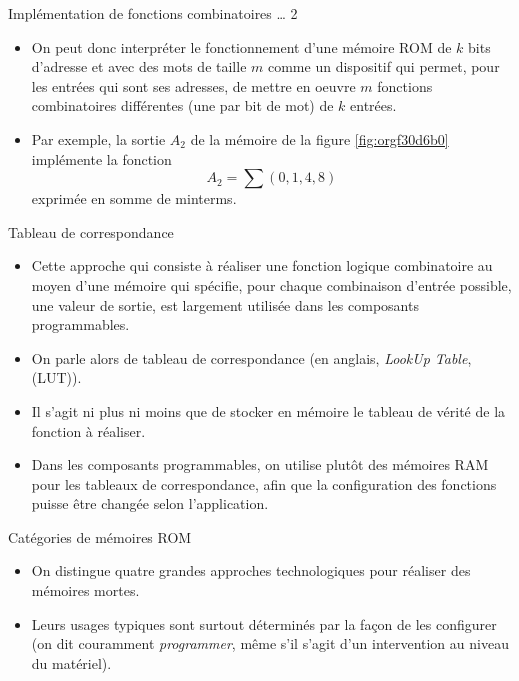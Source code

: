 \documentclass[presentation]{beamer}
\begin{document}
\begin{frame}[label={sec:org19e57ee}]{Implémentation de fonctions combinatoires \ldots{} 2}
\begin{itemize}
\item On peut donc interpréter le fonctionnement d'une mémoire ROM de \(k\) bits d'adresse et avec des mots de taille \(m\) comme un dispositif qui permet, pour les entrées qui sont ses adresses, de mettre en oeuvre \(m\) fonctions combinatoires différentes (une par bit de mot) de \(k\) entrées.

\item Par exemple, la sortie \(A_2\) de la mémoire de la figure \ref{fig:orgf30d6b0} implémente la fonction $$ A_2 = \sum (0,1,4,8) $$ exprimée en somme de minterms.
\end{itemize}
\end{frame}

\begin{frame}[label={sec:org64d5c7b}]{Tableau de correspondance}
\begin{itemize}
\item Cette approche qui consiste à réaliser une fonction logique combinatoire au moyen d'une mémoire qui spécifie, pour chaque combinaison d'entrée possible, une valeur de sortie, est largement utilisée dans les composants programmables.

\item On parle alors de tableau de correspondance (en anglais, \emph{LookUp Table}, (LUT)).

\item Il s'agit ni plus ni moins que de stocker en mémoire le tableau de vérité de la fonction à réaliser.

\item Dans les composants programmables, on utilise plutôt des mémoires RAM pour les tableaux de correspondance, afin que la configuration des fonctions puisse être changée selon l'application.
\end{itemize}
\end{frame}

\begin{frame}[label={sec:orgbd12acf}]{Catégories de mémoires ROM}
\begin{itemize}
\item On distingue quatre grandes approches technologiques pour réaliser des mémoires mortes.

\item Leurs usages typiques sont surtout déterminés par la façon de les configurer (on dit couramment \emph{programmer}, même s'il s'agit d'un intervention au niveau du matériel).
\end{itemize}
\end{frame}
\end{document}

